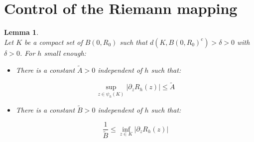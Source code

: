 \documentclass[leqno,11pt,letterpaper, english]{amsart}
\theoremstyle{plain}
\newtheorem{lem}[prop]{Lemma}
\theoremstyle{definition}
\numberwithin{equation}{section}
\begin{document}
\section{Control of the Riemann mapping }
\label{subsect: controle de partialz Rh(z)}
\begin{lem}
		\hfill\\
		Let $K$ be a compact set of $B(0,R_0)$ such that $d(K, B(0,R_0)^c)>\delta>0$ with $\delta>0$. For $h$ small enough:
		\begin{itemize}
			\item There is a constant $\tilde{A}>0$ independent of $h$ such that:
			
			\begin{equation}
				\sup_{z\in \psi_h(K)}|\partial_z R_h(z)|\leq \tilde{A}
			\end{equation}
			
			\item There is a constant $\tilde{B}>0$ independent of $h$ such that:
			
			\begin{equation}
				\frac{1}{\tilde{B}}\leq \inf_{z\in K}|\partial_z R_h(z)|
			\end{equation}
			
		\end{itemize}
	\end{lem}
	
\end{document}
